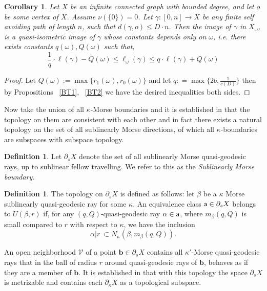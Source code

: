 \documentclass[12 pt]{amsart}
\newcommand{\calV}{\mathcal{V}}
\newcommand{\bfa}{\textbf{a}}
\newcommand{\bfb}{\textbf{b}}
\newtheorem{corollary}[theorem]{Corollary}
\theoremstyle{definition}
\newtheorem{definition}[theorem]{Definition}
\theoremstyle{remark}
\newcommand{\pka}{\partial_{\kappa}}
\renewcommand{\bfa}{{\sf a}}
\newcommand{\ps}{{\partial_s}}
\begin{document}
\begin{corollary}
Let $X$ be an infinite connected graph with bounded degree, and let $o$ be some vertex of $X$. Assume $\nu(\{0\})=0$. Let $\gamma:[0,n]\rightarrow X$ be any finite self avoiding path of length $n$, such that $ d(\gamma, o) \leq D \cdot n$. Then the image of $\gamma$ in $X_\omega$, is a quasi-isometric image of $\gamma$ whose constants depends only on $\omega$, i.e. there exists constants $q(\omega),Q(\omega)$ such that,
\[
 \frac{1}{q} \cdot \ell(\gamma)-Q(\omega)\leq \ell_{\omega}(\gamma) \leq q \cdot \ell(\gamma)+Q(\omega)
\]

\end{corollary}
\begin{proof}
Let $Q(\omega):= \max \{ r_{1}(\omega), r_{0}(\omega) \}$ and let $q: = \max \{2b,\frac{1}{c(D)}\}$ then by Propositions ~\ref{BT1}, ~\ref{BT2} we have the desired inequalities both sides.
\end{proof}


Now take the union of all $\kappa$-Morse boundaries and it is established in \cite{QRT2} that the topology on them are consistent with each other and in fact there exists a natural topology on the set of all sublinearly Morse directions, of which all $\kappa$-boundaries are subspaces with subspace topology.
\begin{definition}
Let $\partial_s X$ denote the set of all sublinearly Morse quasi-geodesic rays, up to sublinear fellow travelling. We refer to this as the \emph{Sublinearly Morse boundary}.
\end{definition}
\begin{definition}
The topology on $\partial_s X$ is defined as follows: let $\beta$ be a $\kappa$ Morse sublinearly quasi-geodesic ray for some $\kappa$. An equivalence class $\bfa \in 
\ps X$ belongs to $U(\beta,r)$ if, for any $(q,Q)$-quasi-geodesic ray $\alpha \in \bfa$,
where $m_\beta(q,Q)$ is small compared to $r$ with respect to $\kappa$, we have the inclusion
\[ \alpha|r \ \subset N_\kappa( \beta,m_\beta(q,Q)).\]
\end{definition}
An open neighborhood $\calV$ of a point $\bfb \in \ps X$ contains all $\kappa'$-Morse quasi-geodesic rays that in the ball of radius $r$ around quasi-geodesic rays of $\bfb$, behaves as if they are a member of $\bfb$. It is established in \cite{QRT2} that with this topology the space $\ps X$ is metrizable and contains each $\pka X$ as a topological subspace.
\end{document}
